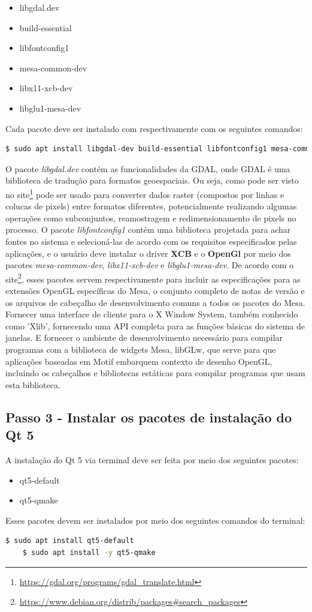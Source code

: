 \begin{itemize}
   	\item libgdal.dev
   	\item build-essential
   	\item libfontconfig1
   	\item mesa-common-dev
   	\item libx11-xcb-dev
   	\item libglu1-mesa-dev
\end{itemize}
Cada pacote deve ser instalado com respectivamente com os seguintes comandos: 
\begin{lstlisting}[language=bash]
	$ sudo apt install libgdal-dev build-essential libfontconfig1 mesa-common-dev libx11-xcb-dev libglu1-mesa-dev
\end{lstlisting}				
	
O pacote \textit{libgdal.dev} contém as funcionalidades da GDAL, onde GDAL é uma biblioteca de tradução para formatos geoespaciais. Ou seja, como pode ser visto no site\footnote{\url{https://gdal.org/programs/gdal_translate.html}} pode ser usado para converter dados raster (compostos por linhas e colucas de pixels) entre formatos diferentes, potencialmente realizando algumas operações como subconjuntos, reamostragem e redimensionamento de pixels no processo.
O pacote \textit{libfontconfig1} contém uma biblioteca projetada para achar fontes no sistema e selecioná-las de acordo com os requisitos especificados pelas aplicações, e o usuário deve instalar o driver \textbf{XCB} e o \textbf{OpenGl} por meio dos pacotes \textit{mesa-common-dev}, \textit{libx11-xcb-dev} e \textit{libglu1-mesa-dev}. De acordo com o site\footnote{\url{https://www.debian.org/distrib/packages\#search\_packages}}, esses pacotes servem respectivamente para incluir as especificações para as extensões OpenGL específicas do Mesa, o conjunto completo de notas de versão e os arquivos de cabeçalho de desenvolvimento comuns a todos os pacotes do Mesa. Fornecer uma interface de cliente para o X Window System, também conhecido como 'Xlib', fornecendo uma API completa para as funções básicas do sistema de janelas. E fornecer o ambiente de desenvolvimento necessário para compilar programas com a biblioteca de widgets Mesa, libGLw, que serve para que aplicações baseadas em Motif embarquem contexto de desenho OpenGL, incluindo os cabeçalhos e bibliotecas estáticas para compilar programas que usam esta biblioteca.
  
\subsection{Passo 3 - Instalar os pacotes de instalação do Qt 5}   
A instalação do Qt 5 via terminal deve ser feita por meio dos seguintes pacotes:
\begin{itemize}
	\item qt5-default
	\item qt5-qmake
\end{itemize}   
Esses pacotes devem ser instalados por meio dos seguintes comandos do terminal:
\begin{lstlisting}[language=bash]
	$ sudo apt install qt5-default
	$ sudo apt install -y qt5-qmake
\end{lstlisting}	
    
